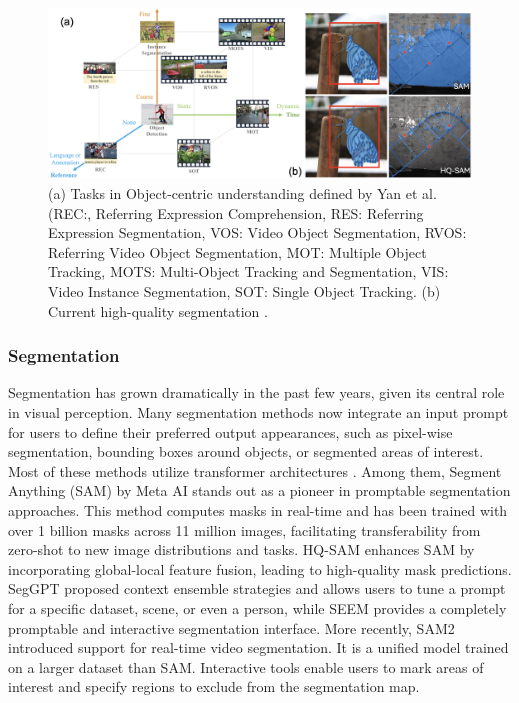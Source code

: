 \documentclass[11pt,a4paper]{article}
\begin{document}
\begin{figure}
    \centering
    \includegraphics[width=\textwidth]{figures/segmentation.png}
    \caption{(a) Tasks in Object-centric understanding defined by Yan et al. \cite{Yan:Universal:2023} (REC:,  Referring Expression Comprehension, RES: Referring Expression Segmentation, VOS:  Video Object Segmentation, RVOS: Referring Video Object Segmentation, MOT: Multiple Object Tracking, MOTS: Multi-Object Tracking and Segmentation, VIS: Video Instance Segmentation, SOT: Single Object Tracking. (b) Current high-quality segmentation \cite{Ke:SAM-HQ:2023}.}
    \label{fig:segmentation}
\end{figure}

\subsubsection{Segmentation}
\label{sssec:seg}

Segmentation has grown dramatically in the past few years, given its central role in visual perception. Many segmentation methods now integrate an input prompt for users to define their preferred output appearances, such as pixel-wise segmentation, bounding boxes around objects, or segmented areas of interest. Most of these methods utilize transformer architectures \cite{Bowen:Marked:2022}. Among them, Segment Anything (SAM) by Meta AI \cite{Kirillov:SAM:2023} stands out as a pioneer in promptable segmentation approaches. This method computes masks in real-time and has been trained with over 1 billion masks across 11 million images, facilitating transferability from zero-shot to new image distributions and tasks. HQ-SAM \cite{Ke:SAM-HQ:2023} enhances SAM by incorporating global-local feature fusion, leading to high-quality mask predictions. SegGPT \cite{Wang:SegGPT:2023} proposed context ensemble strategies and allows users to tune a prompt for a specific dataset, scene, or even a person, while SEEM \cite{Zou:Segment:2023} provides a completely promptable and interactive segmentation interface. More recently, SAM2 \cite{ravi2024sam2} introduced support for real-time video segmentation. It is a unified model trained on a larger dataset than SAM. Interactive tools enable users to mark areas of interest and specify regions to exclude from the segmentation map.
\end{document}
